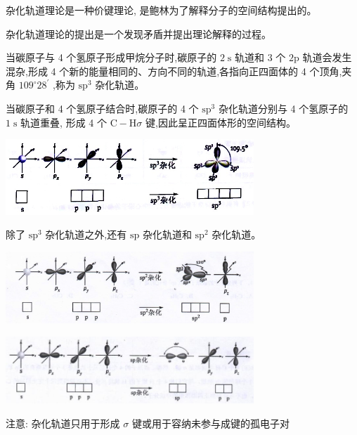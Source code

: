 \documentclass[10pt,cn]{elegantbook}
\begin{document}
杂化轨道理论是一种价键理论, 是鲍林为了解释分子的空间结构提出的。

杂化轨道理论的提出是一个发现矛盾并提出理论解释的过程。

当碳原子与 4 个氢原子形成甲烷分子时,碳原子的 \(2\mathrm{\;s}\) 轨道和 3 个 \(2\mathrm{p}\) 轨道会发生混杂,形成 4 个新的能量相同的、方向不同的轨道,各指向正四面体的 4 个顶角,夹角 \({109}^{ \circ }{28}^{\prime }\) ,称为 \({\mathrm{{sp}}}^{3}\) 杂化轨道。

当碳原子和 4 个氢原子结合时,碳原子的 4 个 \({\mathrm{{sp}}}^{3}\) 杂化轨道分别与 4 个氢原子的 \(1\mathrm{\;s}\) 轨道重叠, 形成 4 个 \(\mathrm{C} - \mathrm{H}\sigma\) 键,因此呈正四面体形的空间结构。

\begin{center}
	\includegraphics[max width=0.7\textwidth]{image/c83-1.jpg}
\end{center}

除了 \({\mathrm{{sp}}}^{3}\) 杂化轨道之外,还有 \(\mathrm{{sp}}\) 杂化轨道和 \({\mathrm{{sp}}}^{2}\) 杂化轨道。

\begin{center}
	\includegraphics[max width=0.7\textwidth]{image/c83-2.jpg}
\end{center}

\begin{center}
	\includegraphics[max width=0.7\textwidth]{image/c84-1.jpg}
\end{center}
注意: 杂化轨道只用于形成 \(\sigma\) 键或用于容纳未参与成键的孤电子对
\end{document}
